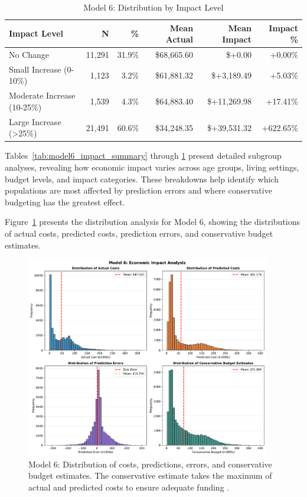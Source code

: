 \begin{table}[htbp]
\centering
\small
\caption{Model 6: Distribution by Impact Level \FiscalYear}
\label{tab:model6_impact_distribution}
\begin{tabular}{lrrrrr}
\toprule
\textbf{Impact Level} & \textbf{N} & \textbf{\%} & \textbf{Mean Actual} & \textbf{Mean Impact} & \textbf{Impact \%} \\
\midrule
No Change & 11,291 & 31.9\% & \$68,665.60 & \$+0.00 & +0.00\% \\
Small Increase (0-10\%) & 1,123 & 3.2\% & \$61,881.32 & \$+3,189.49 & +5.03\% \\
Moderate Increase (10-25\%) & 1,539 & 4.3\% & \$64,883.40 & \$+11,269.98 & +17.41\% \\
Large Increase (>25\%) & 21,491 & 60.6\% & \$34,248.35 & \$+39,531.32 & +622.65\% \\
\bottomrule
\end{tabular}
\end{table}

Tables~\ref{tab:model6_impact_summary} through \ref{tab:model6_impact_distribution} present detailed subgroup analyses, revealing how economic impact varies across age groups, living settings, budget levels, and impact categories. These breakdowns help identify which populations are most affected by prediction errors and where conservative budgeting has the greatest effect.

Figure~\ref{fig:model6_impact_histograms} presents the distribution analysis for Model 6, showing the distributions of actual costs, predicted costs, prediction errors, and conservative budget estimates.

\begin{figure}[htbp]
\centering
\includegraphics[width=0.95\textwidth]{figures/model_6_Impact_Histograms.pdf}
\caption{Model 6: Distribution of costs, predictions, errors, and conservative budget estimates. The conservative estimate takes the maximum of actual and predicted costs to ensure adequate funding \FiscalYear.}
\label{fig:model6_impact_histograms}
\end{figure}


